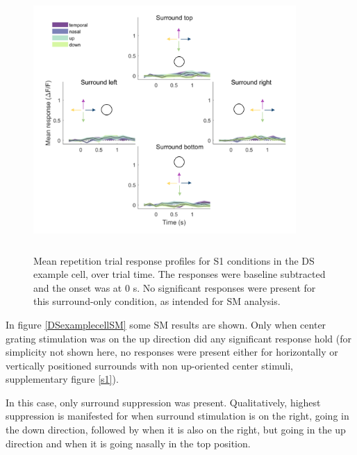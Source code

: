 \begin{figure}[H] \centering \includegraphics[width=10cm,height=10cm,keepaspectratio]{Figures/7.Results/individualSM/roi_29_mf379_pos5/2.png} 
\caption{Mean repetition trial response profiles for S1 conditions in the DS example cell, over trial time. The responses were baseline subtracted and the onset was at 0 s. No significant responses were present for this surround-only condition, as intended for SM analysis.
\label{DSexamplecellsurrounds}}
\end{figure}

In figure \ref{DSexamplecellSM} some SM results are shown. Only when center grating stimulation was on the up direction did any significant response hold (for simplicity not shown here, no responses were present either for horizontally or vertically positioned surrounds with non up-oriented center stimuli, supplementary figure \ref{s1}).

In this case, only surround suppression was present. Qualitatively, highest suppression is manifested for when surround stimulation is on the right, going in the down direction, followed by when it is also on the right, but going in the up direction and when it is going nasally in the top position.

